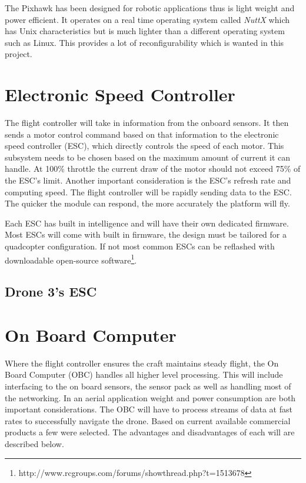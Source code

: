 			The Pixhawk has been designed for robotic applications thus is light weight and power efficient. It operates on a real time operating system called \textit{NuttX} which has Unix characteristics but is much lighter than a different operating system such as Linux. This provides a lot of reconfigurability which is wanted in this project.


		\section{Electronic Speed Controller}
		The flight controller will take in information from the onboard sensors. It then sends a motor control command based on that information to the electronic speed controller (ESC), which directly controls the speed of each motor. This subsystem needs to be chosen based on the maximum amount of current it can handle. At 100\% throttle the current draw of the motor should not exceed 75\% of the ESC's limit. Another important consideration is the ESC's refresh rate and computing speed. The flight controller will be rapidly sending data to the ESC. The quicker the module can respond, the more accurately the platform will fly. 
		
		Each ESC has built in intelligence and will have their own dedicated firmware. Most ESCs will come with built in firmware, the design must be tailored for a quadcopter configuration. If not most common ESCs can be reflashed with downloadable open-source software\footnote{http://www.rcgroups.com/forums/showthread.php?t=1513678}.
		
			\subsection{Drone 3's ESC}
		
		\section{On Board Computer}
		Where the flight controller ensures the craft maintains steady flight, the On Board Computer (OBC) handles all higher level processing. This will include interfacing to the on board sensors, the sensor pack as well as handling most of the networking. In an aerial application weight and power consumption are both important considerations. The OBC will have to process streams of data at fast rates to successfully navigate the drone. Based on current available commercial products a few were selected. The advantages and disadvantages of each will are described below.
			
